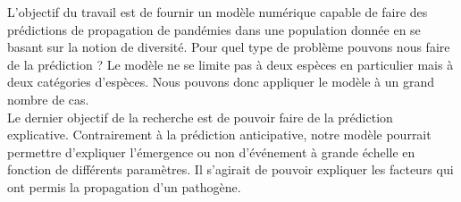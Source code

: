 L'objectif du travail est de fournir un modèle numérique capable de faire des prédictions de propagation de pandémies dans une population donnée en se basant sur la notion de diversité. Pour quel type de problème pouvons nous faire de la prédiction ? Le modèle ne se limite pas à deux espèces en particulier mais à deux catégories d'espèces. Nous pouvons donc appliquer le modèle à un grand nombre de cas.\\

Le dernier objectif de la recherche est de pouvoir faire de la prédiction explicative. Contrairement à la prédiction anticipative, notre modèle pourrait permettre d'expliquer l'émergence ou non d'événement à grande échelle en fonction de différents paramètres. Il s'agirait de pouvoir expliquer les facteurs qui ont permis la propagation d'un pathogène.